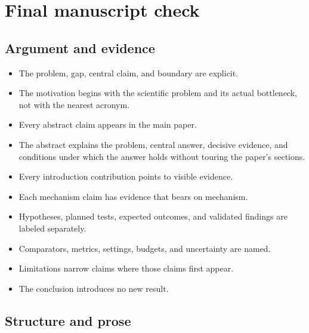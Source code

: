 \clearpage
\section{Final manuscript check}
\label{app:checklist}

\subsection{Argument and evidence}

\begin{itemize}[leftmargin=*,label=\(\square\)]
    \item The problem, gap, central claim, and boundary are explicit.
    \item The motivation begins with the scientific problem and its actual
    bottleneck, not with the nearest acronym.
    \item Every abstract claim appears in the main paper.
    \item The abstract explains the problem, central answer, decisive evidence,
    and conditions under which the answer holds without touring the paper's
    sections.
    \item Every introduction contribution points to visible evidence.
    \item Each mechanism claim has evidence that bears on mechanism.
    \item Hypotheses, planned tests, expected outcomes, and validated findings
    are labeled separately.
    \item Comparators, metrics, settings, budgets, and uncertainty are named.
    \item Limitations narrow claims where those claims first appear.
    \item The conclusion introduces no new result.
\end{itemize}

\subsection{Structure and prose}

